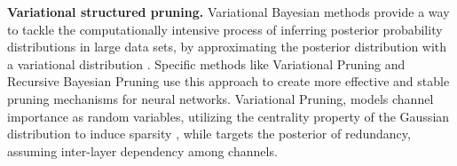 \noindent\textbf{Variational structured pruning.} Variational Bayesian methods
provide a way to tackle the computationally intensive process of inferring
posterior probability distributions in large data sets, by approximating the
posterior distribution with a variational distribution \cite{fox2012tutorial}.
Specific methods like Variational Pruning \cite{DBLP:conf/cvpr/ZhaoNZZZT19} and
Recursive Bayesian Pruning \cite{DBLP:conf/iccv/Zhou0W019} use this approach to
create more effective and stable pruning mechanisms for neural networks.
Variational Pruning, models channel importance as random variables, utilizing
the centrality property of the Gaussian distribution to induce sparsity
\cite{DBLP:conf/cvpr/ZhaoNZZZT19}, while \cite{DBLP:conf/iccv/Zhou0W019} targets
the posterior of redundancy, assuming inter-layer dependency among channels.\\


